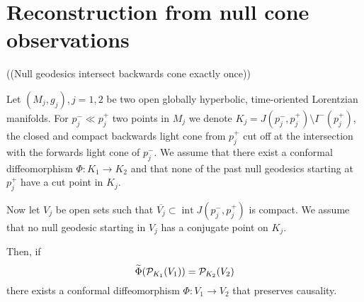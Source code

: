 \section{Reconstruction from null cone observations}
((Null geodesics intersect backwards cone exactly once))
\begin{theorem}\label{thm:babycase}
Let $(M_j,g_j), j=1,2$ be two open globally hyperbolic, time-oriented Lorentzian manifolds. For $p_j^-\ll p_j^+$ two points in $M_j$ we denote $K_j = J(p_j^-,p_j^+) \setminus I^-(p^+_j)$, the closed and compact backwards light cone from $p_j^+$ cut off at the intersection with the forwards light cone of $p_j^-$. We assume that there exist a conformal diffeomorphism $\Phi:K_1\to K_2$ and that none of the past null geodesics starting at $p_j^+$ have a cut point in $K_j$. 

Now let $V_j$ be open sets such that $\overline{V_j}\subset \operatorname{int} J(p_j^-,p_j^+)$ is compact. We assume that no null geodesic starting in $V_j$ has a conjugate point on $K_j$. 

Then, if 
\[
\widetilde{\Phi}(\mathcal{P}_{K_1}(V_1)) = \mathcal{P}_{K_2}(V_2)
\]
there exists a conformal diffeomorphism $\Phi:V_1\to V_2$ that preserves causality.
\end{theorem}

